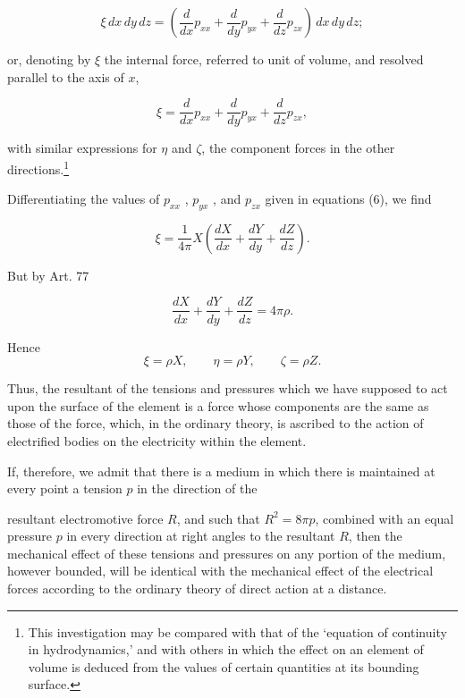 \documentclass[11pt,a4paper]{article}
\begin{document}
\[
\xi\,dx\,dy\,dz=\left(\frac{d}{dx}p_{xx}+\frac{d}{dy}p_{yx}+\frac{d}{dz}p_{zx}\right)\,dx\,dy\,dz;
\]

or, denoting by $\xi$ the internal force, referred to unit of volume, and resolved parallel to the axis of $x$,

\begin{equation}\tag{7}
\xi=\frac{d}{dx}p_{xx}+\frac{d}{dy}p_{yx}+\frac{d}{dz}p_{zx},
\end{equation}

with similar expressions for $\eta$ and $\zeta$, the component forces in the other directions.\footnote[1]{This investigation may be compared with that of the `equation of continuity in hydrodynamics,' and with others in which the effect on an element of volume is deduced from the values of certain quantities at its bounding surface.}

Differentiating the values of  $p_{xx}$ ,  $p_{yx}$ , and  $p_{zx}$  given in equations (6), we find

\begin{equation}\tag{8}
\xi=\frac{1}{4\pi}X\left(\frac{dX}{dx}+\frac{dY}{dy}+\frac{dZ}{dz}\right).
\end{equation}

But by Art. 77

\begin{equation}\tag{9}
\frac{dX}{dx}+\frac{dY}{dy}+\frac{dZ}{dz}=4\pi\rho.
\end{equation}

Hence
\begin{equation}\tag{10}
\xi=\rho X,\qquad \eta=\rho Y,\qquad \zeta=\rho Z.
\end{equation}

Thus, the resultant of the tensions and pressures which we have supposed to act upon the surface of the element is a force whose components are the same as those of the force, which, in the ordinary theory, is ascribed to the action of electrified bodies on the electricity within the element.

If, therefore, we admit that there is a medium in which there is maintained at every point a tension $p$ in the direction of the

\setcounter{footnote}{0}
resultant electromotive force $R$, and such that $R^2=8\pi p$, combined with an equal pressure $p$ in every direction at right angles to the resultant $R$, then the mechanical effect of these tensions and pressures on any portion of the medium, however bounded, will be identical with the mechanical effect of the electrical forces according to the ordinary theory of direct action at a distance.
\end{document}

